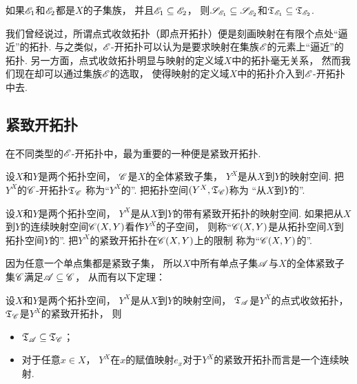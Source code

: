 \begin{proposition}
如果\(\mathscr{E}_1\)和\(\mathscr{E}_2\)都是\(X\)的子集族，
并且\(\mathscr{E}_1 \subseteq \mathscr{E}_2\)，
则\(\mathscr{S}_{\mathscr{E}_1} \subseteq \mathscr{S}_{\mathscr{E}_2}\)和\({\mathfrak T}_{\mathscr{E}_1} \subseteq {\mathfrak T}_{\mathscr{E}_2}\).
\end{proposition}

我们曾经说过，所谓点式收敛拓扑（即点开拓扑）便是刻画映射在有限个点处“逼近”的拓扑.
与之类似，\(\mathscr{E}\)-开拓扑可以认为是要求映射在集族\(\mathscr{E}\)的元素上“逼近”的拓扑.
另一方面，点式收敛拓扑明显与映射的定义域\(X\)中的拓扑毫无关系，
然而我们现在却可以通过集族\(\mathscr{E}\)的选取，
使得映射的定义域\(X\)中的拓扑介入到\(\mathscr{E}\)-开拓扑中去.

\subsection{紧致开拓扑}
在不同类型的\(\mathscr{E}\)-开拓扑中，最为重要的一种便是紧致开拓扑.
\begin{definition}
设\(X\)和\(Y\)是两个拓扑空间，
\(\mathscr{C}\)是\(X\)的全体紧致子集，
\(Y^X\)是从\(X\)到\(Y\)的映射空间.
把\(Y^X\)的\(\mathscr{C}\)-开拓扑\({\mathfrak T}_{\mathscr{C}}\)
称为“\(Y^X\)的”.
把拓扑空间\((Y^X,{\mathfrak T}_{\mathscr{C}})\)称为
“从\(X\)到\(Y\)的”.
\end{definition}

\begin{definition}
设\(X\)和\(Y\)是两个拓扑空间，
\(Y^X\)是从\(X\)到\(Y\)的带有紧致开拓扑的映射空间.
如果把从\(X\)到\(Y\)的连续映射空间\(\mathscr{C}(X,Y)\)看作\(Y^X\)的子空间，
则称“\(\mathscr{C}(X,Y)\)是从拓扑空间\(X\)到拓扑空间\(Y\)的”.
把\(Y^X\)的紧致开拓扑在\(\mathscr{C}(X,Y)\)上的限制
称为“\(\mathscr{C}(X,Y)\)的”.
\end{definition}

因为任意一个单点集都是紧致子集，
所以\(X\)中所有单点子集\(\mathscr{A}\)与\(X\)的全体紧致子集\(\mathscr{C}\)满足\(\mathscr{A} \subseteq \mathscr{C}\)，
从而有以下定理：
\begin{theorem}
设\(X\)和\(Y\)是两个拓扑空间，
\(Y^X\)是从\(X\)到\(Y\)的映射空间，
\({\mathfrak T}_{\mathscr{A}}\)是\(Y^X\)的点式收敛拓扑，
\({\mathfrak T}_{\mathscr{C}}\)是\(Y^X\)的紧致开拓扑，
则\begin{itemize}
	\item \({\mathfrak T}_{\mathscr{A}} \subseteq {\mathfrak T}_{\mathscr{C}}\)；
	\item 对于任意\(x \in X\)，
	\(Y^X\)在\(x\)的赋值映射\(e_x\)对于\(Y^X\)的紧致开拓扑而言是一个连续映射.
\end{itemize}
\end{theorem}
